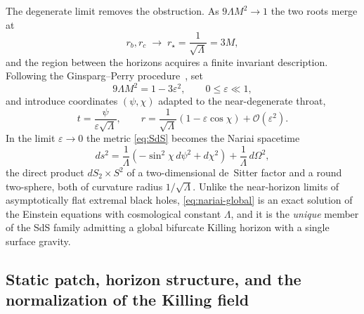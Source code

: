 \documentclass[11pt]{article}
\newcommand{\Nariai}{Nariai}
\begin{document}
The degenerate limit removes the obstruction. As $9\Lambda M^2 \to 1$ the two roots merge at
\begin{equation}
r_b, r_c \;\to\; r_\star = \frac{1}{\sqrt{\Lambda}} = 3M,
\end{equation}
and the region between the horizons acquires a finite invariant description. Following the Ginsparg--Perry procedure~\cite{GinspargPerry}, set
\begin{equation}
9\Lambda M^2 = 1 - 3\varepsilon^2, \qquad 0 \le \varepsilon \ll 1,
\end{equation}
and introduce coordinates $(\psi, \chi)$ adapted to the near-degenerate throat,
\begin{equation}
t = \frac{\psi}{\varepsilon\sqrt{\Lambda}},
\qquad
r = \frac{1}{\sqrt{\Lambda}}\left(1 - \varepsilon\cos\chi \right) + \mathcal{O}(\varepsilon^2).
\end{equation}
In the limit $\varepsilon \to 0$ the metric \eqref{eq:SdS} becomes the \Nariai{} spacetime~\cite{Nariai}
\begin{equation}
ds^2 = \frac{1}{\Lambda}\left(-\sin^2\!\chi \, d\psi^2 + d\chi^2\right) + \frac{1}{\Lambda}\, d\Omega^2 ,
\label{eq:nariai-global}
\end{equation}
the direct product $dS_2 \times S^2$ of a two-dimensional de~Sitter factor and a round two-sphere, both of curvature radius $1/\sqrt{\Lambda}$. Unlike the near-horizon limits of asymptotically flat extremal black holes, \eqref{eq:nariai-global} is an exact solution of the Einstein equations with cosmological constant $\Lambda$, and it is the \emph{unique} member of the SdS family admitting a global bifurcate Killing horizon with a single surface gravity.

\subsection{Static patch, horizon structure, and the normalization of the Killing field}
\end{document}
